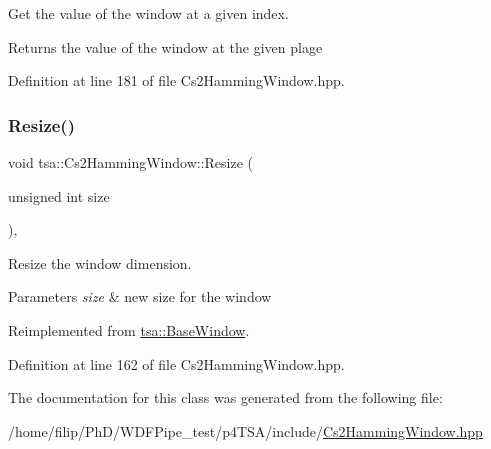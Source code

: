 Get the value of the window at a given index.

\begin{DoxyReturn}{Returns}
the value of the window at the given plage 
\end{DoxyReturn}


Definition at line 181 of file Cs2\+Hamming\+Window.\+hpp.

\mbox{\label{classtsa_1_1_cs2_hamming_window_aa455906419c91055a59da8381c3a7588}} 
\subsubsection{\texorpdfstring{Resize()}{Resize()}}
{\footnotesize\ttfamily void tsa\+::\+Cs2\+Hamming\+Window\+::\+Resize (\begin{DoxyParamCaption}\item[{unsigned int}]{size }\end{DoxyParamCaption})\hspace{0.3cm}{\ttfamily [inline]}, {\ttfamily [virtual]}}

Resize the window dimension.


\begin{DoxyParams}{Parameters}
{\em size} & new size for the window \\
\hline
\end{DoxyParams}


Reimplemented from \hyperlink{classtsa_1_1_base_window_a8a2a3425f2915762d50fa57dd0e04f22}{tsa\+::\+Base\+Window}.



Definition at line 162 of file Cs2\+Hamming\+Window.\+hpp.



The documentation for this class was generated from the following file\+:\begin{DoxyCompactItemize}
\item 
/home/filip/\+Ph\+D/\+W\+D\+F\+Pipe\+\_\+test/p4\+T\+S\+A/include/\hyperlink{_cs2_hamming_window_8hpp}{Cs2\+Hamming\+Window.\+hpp}\end{DoxyCompactItemize}
